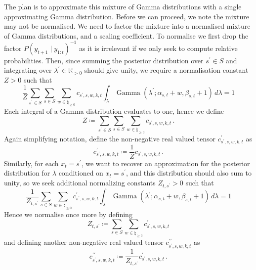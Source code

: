 \documentclass[twoside, 11pt]{article}
\DeclareMathOperator*{\gammad}{Gamma}
\newcommand{\reals}[0] {\mathbb{R}}
\begin{document}
The plan is to approximate this mixture of Gamma distributions with a single approximating Gamma distribution. Before we can proceed, we note the mixture may not be normalised. We need to factor the mixture into a normalised mixture of Gamma distributions, and a scaling coefficient. To normalise we first drop the factor $P(y_{t+1} \mid y_{1:t})^{-1}$ as it is irrelevant if we only seek to compute relative probabilities. Then, since summing the posterior distribution over $s^{\prime} \in S$ and integrating over $\lambda^{\prime} \in \reals_{>0}$ should give unity, we require a normalisation constant $Z > 0$ such that
\begin{equation}
\frac{1}{Z}
\sum_{s^{\prime} \in S}
\sum_{s \in S}
\sum_{w \in \natural_{\geq 0}}
c_{s^{\prime}, s, w, k, t}
\int_{\lambda}
\gammad(\lambda^{\prime} ; \alpha_{s,t} + w, \beta_{s,t} + 1)
\,d\lambda = 1 \nonumber
\end{equation}
Each integral of a Gamma distribution evaluates to one, hence we define
\begin{equation}
Z \coloneqq 
\sum_{s^{\prime} \in S}
\sum_{s \in S}
\sum_{w \in \natural_{\geq 0}}
c_{s^{\prime}, s, w, k, t} \, .
\end{equation}
Again simplifying notation, define the non-negative real valued tensor $c^{\prime}_{s^{\prime}, s, w, k, t}$ as
\begin{equation}
c^{\prime}_{s^{\prime}, s, w, k, t} \coloneqq \frac{1}{Z}
c_{s^{\prime}, s, w, k, t} \, .
\end{equation}
Similarly, for each $x_t=s^{\prime}$, we want to recover an approximation for the posterior distribution for $\lambda$ conditioned on $x_{t}=s^{\prime}$, and this distribution should also sum to unity, so we seek additional normalizing constants $Z_{t,s^{\prime}} > 0$ such that
\begin{equation}
\frac{1}{Z_{t,s^{\prime}}}
\sum_{s \in S}
\sum_{w \in \natural_{\geq 0}}
c^{\prime}_{s^{\prime}, s, w, k, t}
\int_{\lambda}
\gammad(\lambda^{\prime} ; \alpha_{s,t} + w, \beta_{s,t} + 1)
\,d\lambda = 1 \nonumber
\end{equation}
Hence we normalise once more by defining
\begin{equation}
Z_{t,s^{\prime}}
\coloneqq
\sum_{s \in S}
\sum_{w \in \natural_{\geq 0}}
c^{\prime}_{s^{\prime}, s, w, k, t}
\end{equation}
and defining another non-negative real valued tensor $c^{\prime\prime}_{s^{\prime}, s, w, k, t}$ as
\begin{equation}
c^{\prime\prime}_{s^{\prime}, s, w, k, t} \coloneqq \frac{1}{Z_{t, s^{\prime}}}
c^{\prime}_{s^{\prime}, s, w, k, t} \, .
\end{equation}
\end{document}
